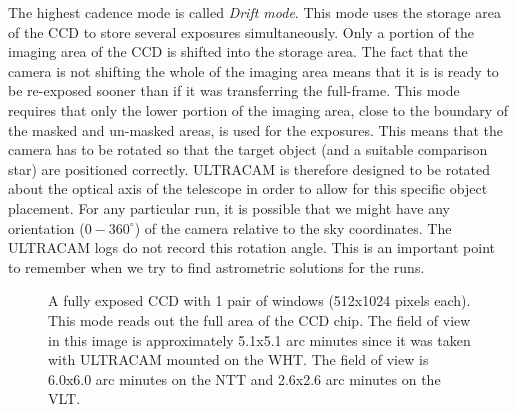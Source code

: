 The highest cadence mode is called \emph{Drift mode}. This mode uses the storage area of the CCD to store several exposures simultaneously. Only a portion of the imaging area of the CCD is shifted into the storage area. The fact that the camera is not shifting the whole of the imaging area means that it is is ready to be re-exposed sooner than if it was transferring the full-frame. This mode requires that only the lower portion of the imaging area, close to the boundary of the masked and un-masked areas, is used for the exposures. This means that the camera has to be rotated so that the target object (and a suitable comparison star) are positioned correctly. ULTRACAM is therefore designed to be rotated about the optical axis of the telescope in order to allow for this specific object placement. For any particular run, it is possible that we might have any orientation ($0-360^{\circ}$) of the camera relative to the sky coordinates. The ULTRACAM logs do not record this rotation angle. This is an important point to remember when we try to find astrometric solutions for the runs.    

\begin{figure}
  \centering
  \setlength{\fboxsep}{0pt}
  \setlength{\fboxrule}{1pt}
  \caption{A fully exposed CCD with 1 pair of windows (512x1024 pixels each).  This mode reads out the full area of the CCD chip. The field of view in this image is approximately 5.1x5.1 arc minutes since it was taken with ULTRACAM mounted on the WHT. The field of view is 6.0x6.0 arc minutes on the NTT and 2.6x2.6 arc minutes on the VLT.}
  \label{fig:KOI-824}
\end{figure}

